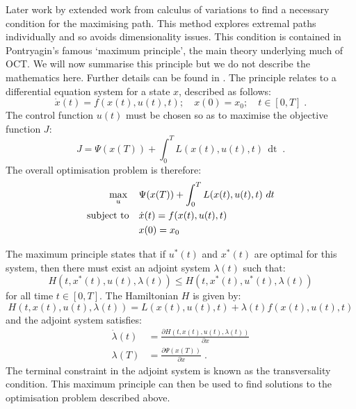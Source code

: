 Later work by \citet{pontryagin_mathematical_1962} extended work from calculus of variations to find a necessary condition for the maximising path. This method explores extremal paths individually and so avoids dimensionality issues. This condition is contained in Pontryagin's famous `maximum principle', the main theory underlying much of OCT. We will now summarise this principle but we do not describe the mathematics here. Further details can be found in \citet{lenhart_optimal_2007}. The principle relates to a differential equation system for a state $x$, described as follows:
\begin{equation}
    \dot{x}(t) = f(x(t), u(t), t);\quad{}x(0)=x_0;\quad{}t\in{}\left[0, T\right]\;.
\end{equation}
The control function $u(t)$ must be chosen so as to maximise the objective function $J$:
\begin{equation}
    J = \Psi{}(x(T)) + \int_0^TL(x(t), u(t), t)\,\mathop{dt}\;.
\end{equation}
The overall optimisation problem is therefore:
\begin{subequations}\label{eqn:ch2:opt_problem}
    \begin{align}
        \max_u \quad{} &\null \Psi{}(x(T)) + \int_0^TL(x(t), u(t), t)\,\mathop{dt} \label{eqn:ch2:opt_problem_a}\\
        \text{subject to} \quad{} &\null \dot{x}(t) = f(x(t), u(t), t) \label{eqn:ch2:opt_problem_b}\\
        &\null x(0)=x_0 \label{eqn:ch2:opt_problem_c}
    \end{align}
\end{subequations}

The maximum principle states that if $u^*(t)$ and $x^*(t)$ are optimal for this system, then there must exist an adjoint system $\lambda(t)$ such that:
\begin{equation}
    H(t, x^*(t), u(t), \lambda(t)) \leq H(t, x^*(t), u^*(t), \lambda(t))
\end{equation}
for all time $t \in \left[0, T\right]$. The Hamiltonian $H$ is given by:
\begin{equation}
    H(t, x(t), u(t), \lambda(t)) = L(x(t), u(t), t) + \lambda(t)f(x(t), u(t), t)
\end{equation}
and the adjoint system satisfies:
\begin{subequations}\label{eqn:ch2:adjoint_system}
    \begin{align}
        \dot{\lambda}(t) &= \frac{\partial H(t, x(t), u(t), \lambda(t))}{\partial x} \label{eqn:ch2:adjoint_system_a}\\
        \lambda(T) &= \frac{\partial \Psi(x(T))}{\partial x}\;. \label{eqn:ch2:adjoint_system_b}
    \end{align}
\end{subequations}
The terminal constraint in the adjoint system is known as the transversality condition. This maximum principle can then be used to find solutions to the optimisation problem described above.

